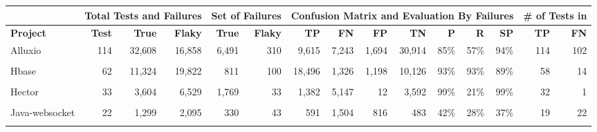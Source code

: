 \begin{table*}[t]
\begin{tabular}{l|rrr|rr|rrrrrrr|rr}
      & \multicolumn{3}{c|}{\textbf{Total Tests and Failures}} & \multicolumn{2}{c|}{\textbf{Set of Failures}} & \multicolumn{7}{c}{\textbf{Confusion Matrix and Evaluation By Failures}} &  \multicolumn{2}{c}{\textbf{\# of Tests in}} \\
    \midrule
     \textbf{Project}&\textbf{Test}&\textbf{True}&\textbf{Flaky} &\textbf{True}&\textbf{Flaky} &\textbf{TP}&\textbf{FN}&\textbf{FP}&\textbf{TN}&\textbf{P} &\textbf{R} &\textbf{SP} & \textbf{TP}&\textbf{FN}\\
\midrule
Alluxio&114&32,608&16,858&6,491&310&9,615&7,243&1,694&30,914&85\%&57\%&94\%&114&102\\
\cellcolor{gray!6}{Okhttp}&\cellcolor{gray!6}{100}&\cellcolor{gray!6}{34,266}&\cellcolor{gray!6}{28,264}&\cellcolor{gray!6}{18,609}&\cellcolor{gray!6}{121}&\cellcolor{gray!6}{16,517}&\cellcolor{gray!6}{11,747}&\cellcolor{gray!6}{114}&\cellcolor{gray!6}{34,152}&\cellcolor{gray!6}{99\%}&\cellcolor{gray!6}{58\%}&\cellcolor{gray!6}{99\%}&\cellcolor{gray!6}{58}&\cellcolor{gray!6}{53}\\
Hbase&62&11,324&19,822&811&100&18,496&1,326&1,198&10,126&93\%&93\%&89\%&58&14\\
\cellcolor{gray!6}{Ambari}&\cellcolor{gray!6}{51}&\cellcolor{gray!6}{11,049}&\cellcolor{gray!6}{4,063}&\cellcolor{gray!6}{4,563}&\cellcolor{gray!6}{54}&\cellcolor{gray!6}{4,003}&\cellcolor{gray!6}{60}&\cellcolor{gray!6}{5}&\cellcolor{gray!6}{11,044}&\cellcolor{gray!6}{99\%}&\cellcolor{gray!6}{98\%}&\cellcolor{gray!6}{99\%}&\cellcolor{gray!6}{50}&\cellcolor{gray!6}{2}\\
Hector&33&3,604&6,529&1,769&33&1,382&5,147&12&3,592&99\%&21\%&99\%&32&1\\
\cellcolor{gray!6}{Activiti}&\cellcolor{gray!6}{31}&\cellcolor{gray!6}{46,100}&\cellcolor{gray!6}{1,378}&\cellcolor{gray!6}{16,018}&\cellcolor{gray!6}{32}&\cellcolor{gray!6}{932}&\cellcolor{gray!6}{446}&\cellcolor{gray!6}{2,609}&\cellcolor{gray!6}{43,491}&\cellcolor{gray!6}{26\%}&\cellcolor{gray!6}{67\%}&\cellcolor{gray!6}{94\%}&\cellcolor{gray!6}{1}&\cellcolor{gray!6}{30}\\
Java-websocket&22&1,299&2,095&330&43&591&1,504&816&483&42\%&28\%&37\%&19&22\\
\cellcolor{gray!6}{Httpcore}&\cellcolor{gray!6}{22}&\cellcolor{gray!6}{8,333}&\cellcolor{gray!6}{354}&\cellcolor{gray!6}{663}&\cellcolor{gray!6}{22}&\cellcolor{gray!6}{0}&\cellcolor{gray!6}{354}&\cellcolor{gray!6}{2,117}&\cellcolor{gray!6}{6,216}&\cellcolor{gray!6}{0\%}&\cellcolor{gray!6}{0\%}&\cellcolor{gray!6}{74\%}&\cellcolor{gray!6}{0}&\cellcolor{gray!6}{22}\\

\end{tabular}
\end{table*}
